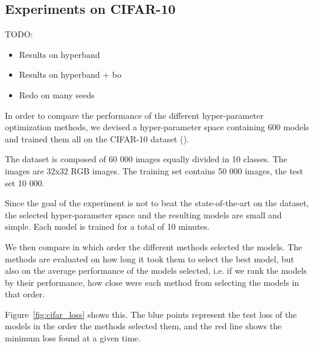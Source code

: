 \subsection{Experiments on CIFAR-10}

TODO:
\begin{itemize}
    \item Results on hyperband
    \item Results on hyperband + bo
    \item Redo on many seeds
\end{itemize}

In order to compare the performance of the different hyper-parameter optimization methods, we devised a hyper-parameter space containing 600 models and trained them all on the CIFAR-10 dataset (\textcite{krizhevsky2009}).

The dataset is composed of 60 000 images equally divided in 10 classes. The images are 32x32 RGB images. The training set contains 50 000 images, the test set 10 000.

Since the goal of the experiment is not to beat the state-of-the-art on the dataset, the selected hyper-parameter space and the resulting models are small and simple. Each model is trained for a total of 10 minutes. 

We then compare in which order the different methods selected the models. The methods are evaluated on how long it took them to select the best model, but also on the average performance of the models selected, i.e. if we rank the models by their performance, how close were each method from selecting the models in that order.

Figure~\ref{fig:cifar_loss} shows this. The blue points represent the test loss of the models in the order the methods selected them, and the red line shows the minimum loss found at a given time. 

